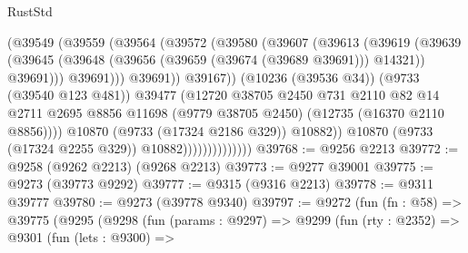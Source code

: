 \begin{lexlean}{RustStd}
\begin{coremodule}
                                      (@39549
                                        (@39559
                                          (@39564
                                            (@39572
                                              (@39580
                                                (@39607
                                                  (@39613
                                                    (@39619
                                                      (@39639
                                                        (@39645
                                                          (@39648
                                                            (@39656
                                                              (@39659 (@39674 (@39689 @39691)))
                                                              @14321))
                                                          @39691)))
                                                    @39691)))
                                              @39691))
                                          @39167))
                                      (@10236 (@39536 @34))
                                      (@9733 (@39540 @123 @481))
                                      @39477
                                      (@12720
                                        @38705
                                        @2450
                                        @731
                                        @2110
                                        @82
                                        @14
                                        @2711
                                        @2695
                                        @8856
                                        @11698
                                        (@9779 @38705 @2450)
                                        (@12735 (@16370 @2110 @8856))))
                                    @10870
                                    (@9733 (@17324 @2186 @329))
                                    @10882))
                                @10870
                                (@9733 (@17324 @2255 @329))
                                @10882))))))))))))))
@39768 := @9256 @2213
@39772 := @9258 (@9262 @2213) (@9268 @2213)
@39773 := @9277 @39001
@39775 := @9273 (@39773 @9292)
@39777 := @9315 (@9316 @2213)
@39778 := @9311 @39777
@39780 := @9273 (@39778 @9340)
@39797 := @9272
    (fun (fn : @58) =>
    @39775
      (@9295
        (@9298
          (fun (params : @9297) =>
          @9299
            (fun (rty : @2352) =>
            @9301
              (fun (lets : @9300) =>

\end{coremodule}
\end{lexlean}
